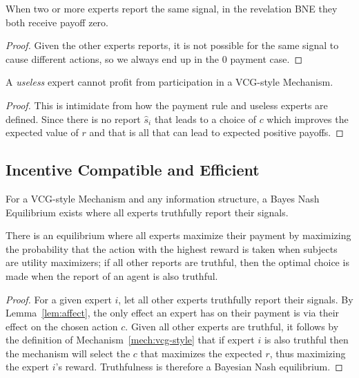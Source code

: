 \begin{lem}
	When two or more experts report the same signal, in the revelation BNE they both receive payoff zero. 
\end{lem}

\begin{proof}
	Given the other experts reports, it is not possible for the same signal to cause different actions, so we always end up in the 0 payment case.
\end{proof}


\begin{lem}
	A \emph{useless} expert cannot profit from participation in a VCG-style Mechanism.
\end{lem}

\begin{proof}
This is intimidate from how the payment rule and useless experts are defined. Since there is no report $\hat{s}_i$ that leads to a choice of $c$ which improves the expected value of $r$ and that is all that can lead to expected positive payoffs.
\end{proof}


\subsection{Incentive Compatible and Efficient}

\begin{thm}
	For a VCG-style Mechanism and any information structure, a Bayes Nash Equilibrium exists where all experts truthfully report their signals.
\end{thm}

There is an equilibrium where all experts maximize their payment by maximizing the probability that the action with the highest reward is taken when subjects are utility maximizers; if all other reports are truthful, then the optimal choice is made when the report of an agent is also truthful.

\begin{proof}
For a given expert $i$, let all other experts truthfully report their signals. By Lemma~\ref{lem:affect}, the only effect an expert has on their payment is via their effect on the chosen action $c$. Given all other experts are truthful, it follows by the definition of Mechanism~\ref{mech:vcg-style} that if expert $i$ is also truthful then the mechanism will select the $c$ that maximizes the expected $r$, thus maximizing the expert $i$'s reward. Truthfulness is therefore a Bayesian Nash equilibrium.
\end{proof}


